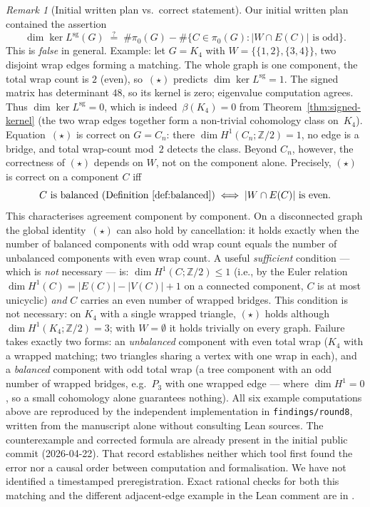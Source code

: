 \documentclass[11pt,a4paper]{amsart}
\theoremstyle{plain}
\theoremstyle{definition}
\theoremstyle{remark}
\newtheorem{remark}[theorem]{Remark}
\DeclareMathOperator{\Ker}{ker}
\newcommand{\ZZ}{\mathbb{Z}}
\newcommand{\Lsigned}{L^{\operatorname{sg}}}
\newcommand{\comp}{\pi_0}
\begin{document}
\begin{remark}[Initial written plan vs.\ correct statement]
\label{rem:initial-plan}
Our initial written plan contained the assertion
\[
  \dim\Ker\Lsigned(G) \;\overset{?}{=}\; \#\comp(G) -
    \#\{C\in\comp(G) : |W\cap E(C)|\text{ is odd}\}. \tag{$\star$}
\]
This is \emph{false} in general. Example: let $G=K_4$ with
$W=\{\{1,2\},\{3,4\}\}$, two disjoint wrap edges forming a
matching. The whole graph is one component, the total wrap count
is $2$ (even), so~$(\star)$ predicts
$\dim\Ker\Lsigned = 1$. The signed matrix has determinant $48$,
so its kernel is zero; eigenvalue computation agrees. Thus
$\dim \Ker\Lsigned = 0$, which is indeed~$\beta(K_4)=0$
from Theorem~\ref{thm:signed-kernel} (the two wrap edges
together form a non-trivial cohomology class on~$K_4$).
Equation~$(\star)$ is correct on $G=C_n$: there
$\dim H^1(C_n;\ZZ/2)=1$, no edge is a bridge, and total wrap-count
mod~$2$ detects the class. Beyond $C_n$, however, the correctness of
$(\star)$ depends on $W$, not on the component alone. Precisely,
$(\star)$ is correct on a component $C$ iff
\[
  \text{$C$ is balanced (Definition~\ref{def:balanced})}\;\Longleftrightarrow\;
  |W\cap E(C)| \text{ is even.}
\]
This characterises agreement component by component. On a disconnected
graph the global identity~$(\star)$ can also hold by cancellation: it
holds exactly when the number of balanced components with odd wrap
count equals the number of unbalanced components with even wrap count.
A useful \emph{sufficient} condition --- which is \emph{not} necessary ---
is: $\dim H^1(C;\ZZ/2)\le 1$ (i.e., by the Euler relation
$\dim H^1(C)=|E(C)|-|V(C)|+1$ on a connected component, $C$ is at most
unicyclic) \emph{and} $C$ carries an even number of wrapped bridges.
This condition is not necessary: on $K_4$ with a single wrapped triangle, $(\star)$
holds although $\dim H^1(K_4;\ZZ/2)=3$; with $W=\emptyset$ it holds
trivially on every graph. Failure takes exactly two forms: an
\emph{unbalanced} component with even total wrap ($K_4$ with a wrapped
matching; two triangles sharing a vertex with one wrap in each), and a
\emph{balanced} component with odd total wrap (a tree component with an
odd number of wrapped bridges, e.g.\ $P_3$ with one wrapped edge ---
where $\dim H^1=0$, so a small cohomology alone guarantees nothing).
All six example computations above are reproduced by the independent
implementation in \texttt{findings/round8}, written from the manuscript
alone without consulting Lean sources. The counterexample and corrected
formula are already present in the initial public commit (2026-04-22).
That record establishes neither which tool first found the error nor
a causal order between computation and formalisation. We have not
identified a timestamped preregistration. Exact rational checks for
both this matching and the different adjacent-edge example in the
Lean comment are in .
\end{remark}
\end{document}
